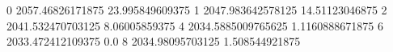 0 2057.46826171875 23.995849609375
1 2047.983642578125 14.51123046875
2 2041.532470703125 8.06005859375
4 2034.5885009765625 1.1160888671875
6 2033.472412109375 0.0
8 2034.98095703125 1.508544921875
